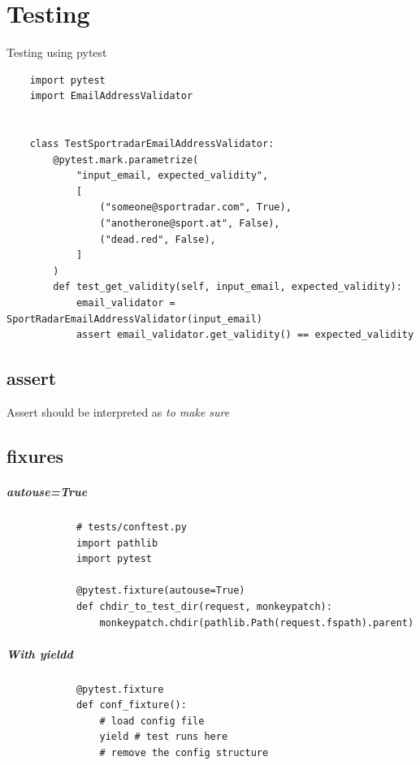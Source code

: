 \chapter{Testing}
Testing using pytest
\begin{verbatim}
    import pytest
    import EmailAddressValidator
    
    
    class TestSportradarEmailAddressValidator:
        @pytest.mark.parametrize(
            "input_email, expected_validity",
            [
                ("someone@sportradar.com", True),
                ("anotherone@sport.at", False),
                ("dead.red", False),
            ]
        )
        def test_get_validity(self, input_email, expected_validity):
            email_validator = SportRadarEmailAddressValidator(input_email)
            assert email_validator.get_validity() == expected_validity
\end{verbatim}

\section{assert}
Assert should be interpreted as \textit{to make sure}

\section{fixures}
    
    \paragraph{autouse=True}
        \begin{verbatim}
            # tests/conftest.py
            import pathlib
            import pytest
            
            @pytest.fixture(autouse=True)
            def chdir_to_test_dir(request, monkeypatch):
                monkeypatch.chdir(pathlib.Path(request.fspath).parent)
        \end{verbatim}
    \paragraph{With yieldd}
        \begin{verbatim}
            @pytest.fixture
            def conf_fixture():
                # load config file
                yield # test runs here
                # remove the config structure
        \end{verbatim}
        

